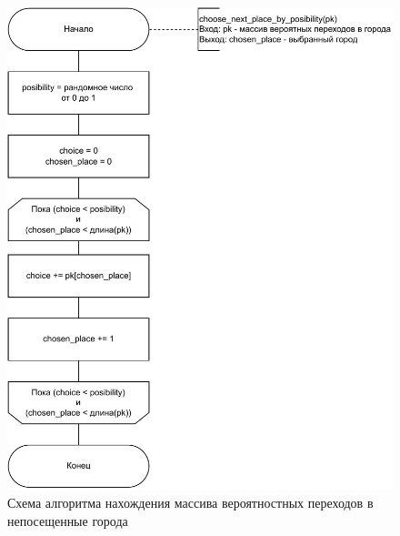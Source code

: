 \begin{figure}[h!]
	\centering
	\includegraphics[width=0.9\linewidth]{img/ant_choose}
	\caption{Схема алгоритма нахождения массива вероятностных переходов в непосещенные города}
	\label{fig:ant_choose}
\end{figure}
